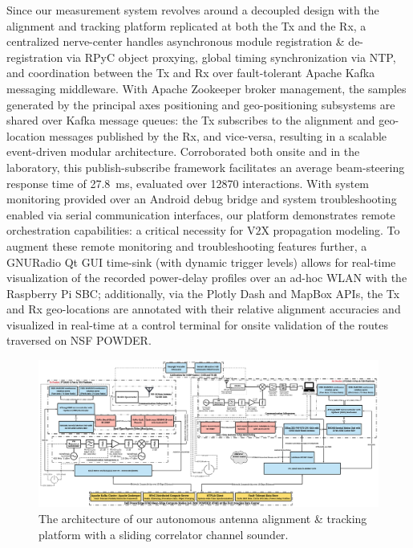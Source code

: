 \documentclass[10pt, twocolumn]{IEEEtran}
\begin{document}
Since our measurement system revolves around a decoupled design with the alignment and tracking platform replicated at both the Tx and the Rx, a centralized nerve-center handles asynchronous module registration \& de-registration via RPyC object proxying, global timing synchronization via NTP, and coordination between the Tx and Rx over fault-tolerant Apache Kafka messaging middleware. With Apache Zookeeper broker management, the samples generated by the principal axes positioning and geo-positioning subsystems are shared over Kafka message queues: the Tx subscribes to the alignment and geo-location messages published by the Rx, and vice-versa, resulting in a scalable event-driven modular architecture. Corroborated both onsite and in the laboratory, this publish-subscribe framework facilitates an average beam-steering response time of \SI{27.8}{\milli\second}, evaluated over \SI{12870}{} interactions. With system monitoring provided over an Android debug bridge and system troubleshooting enabled via serial communication interfaces, our platform demonstrates remote orchestration capabilities: a critical necessity for V$2$X propagation modeling. To augment these remote monitoring and troubleshooting features further, a GNURadio Qt GUI time-sink (with dynamic trigger levels) allows for real-time visualization of the recorded power-delay profiles over an ad-hoc WLAN with the Raspberry Pi SBC; additionally, via the Plotly Dash and MapBox APIs, the Tx and Rx geo-locations are annotated with their relative alignment accuracies and visualized in real-time at a control terminal for onsite validation of the routes traversed on NSF POWDER.
\begin{figure} [t]
    \centering
    \includegraphics[width=1.0\textwidth]{figs/system_architecture.jpg}
    \vspace{-6mm}
    \caption{The architecture of our autonomous antenna alignment \& tracking platform with a sliding correlator channel sounder.}
    \label{F1}
    \vspace{-7mm}
\end{figure}
\vspace{-4.5mm}
\end{document}
